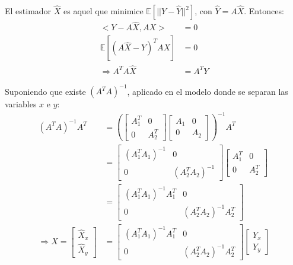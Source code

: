 
	El estimador $\hat{X}$ es aquel que minimice $\mathbb{E}\left[||Y-\hat{Y}||^2\right]$, con $\hat{Y}=A\hat{X}$. Entonces:
	\begin{align*}
		< Y - A\hat{X}, A X> &= 0\\
		\mathbb{E}\left[ (A \hat{X}-Y)^T A X\right] &= 0\\
		\Rightarrow A^T A \hat{X} &= A^T Y
	\end{align*}

	Suponiendo que existe $\left(A^T A\right)^{-1}$, aplicado en el modelo donde se separan las variables $x$ e $y$:
	\begin{align*}
		\left(A^T A\right)^{-1} A^T &=\left(\begin{bmatrix} A^T_1 & 0\\0 & A^T_2\end{bmatrix} \begin{bmatrix} A_1 & 0\\0& A_2\end{bmatrix}\right)^{-1} A^T \\ &= \begin{bmatrix} (A^T_1 A_1)^{-1} & 0 \\ 0& (A^T_2 A_2)^{-1}\end{bmatrix} \begin{bmatrix} A^T_1&0\\0&A^T_2\end{bmatrix} \\&= \begin{bmatrix} (A^T_1 A_1)^{-1}A^T_1 & 0 \\ 0& (A^T_2 A_2)^{-1}A^T_2\end{bmatrix}\\
		\Rightarrow \hat{X} = \begin{bmatrix} \hat{X}_x \\ \hat{X}_y \end{bmatrix} &= \begin{bmatrix} (A^T_1 A_1)^{-1}A^T_1 & 0 \\ 0& (A^T_2 A_2)^{-1}A^T_2\end{bmatrix} \begin{bmatrix} Y_x\\Y_y \end{bmatrix}
	\end{align*}

